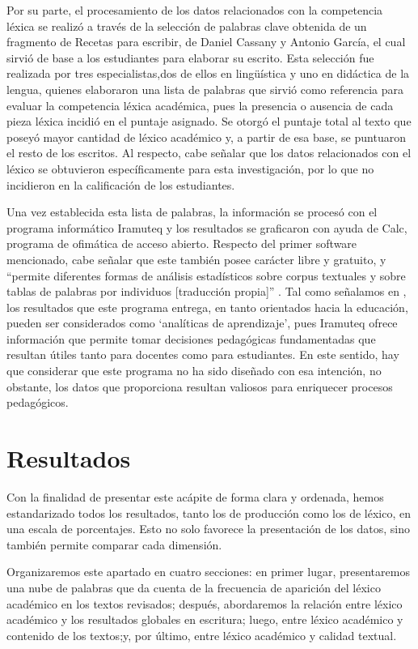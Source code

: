 \documentclass{textolivre-html}
\begin{document}
Por su parte, el procesamiento de los datos relacionados con la competencia
léxica se realizó a través de la selección de palabras clave obtenida de un
fragmento de Recetas para escribir, de Daniel Cassany y Antonio García, el cual
sirvió de base a los estudiantes para elaborar su escrito. Esta selección fue
realizada por tres especialistas,dos de ellos en lingüística y uno en didáctica
de la lengua, quienes elaboraron una lista de palabras que sirvió como
referencia para evaluar la competencia léxica académica, pues la presencia o
ausencia de cada pieza léxica incidió en el puntaje asignado. Se otorgó
el puntaje total al texto que poseyó mayor cantidad de léxico académico y, a
partir de esa base, se puntuaron el resto de los escritos. Al respecto, cabe
señalar que los datos relacionados con el léxico se obtuvieron específicamente
para esta investigación, por lo que no incidieron en la calificación de los
estudiantes.

Una vez establecida esta lista de palabras, la información se procesó con
el programa informático Iramuteq y los resultados se graficaron con ayuda de
Calc, programa de ofimática de acceso abierto. Respecto del primer software
mencionado, cabe señalar que este también posee carácter libre y gratuito, y
“permite diferentes formas de análisis estadísticos sobre corpus textuales y
sobre tablas de palabras por individuos [traducción propia]” \cite[p. 513]{Camargo2013}.
Tal como señalamos en , los resultados que este programa
entrega, en tanto orientados hacia la educación, pueden ser considerados como
‘analíticas de aprendizaje’, pues Iramuteq ofrece información que permite tomar
decisiones pedagógicas fundamentadas que resultan útiles tanto para docentes
como para estudiantes. En este sentido, hay que considerar que este programa no
ha sido diseñado con esa intención, no obstante, los datos que proporciona
resultan valiosos para enriquecer procesos pedagógicos.



\section{Resultados}\label{sec-resultados}
Con la finalidad de presentar este acápite de forma clara y ordenada,
hemos estandarizado todos los resultados, tanto los de producción como los de
léxico, en una escala de porcentajes. Esto no solo favorece la presentación de
los datos, sino también permite comparar cada dimensión.

Organizaremos este apartado en cuatro secciones: en primer lugar,
presentaremos una nube de palabras que da cuenta de la frecuencia de aparición
del léxico académico en los textos revisados; después, abordaremos la relación
entre léxico académico y los resultados globales en escritura; luego, entre
léxico académico y contenido de los textos;y, por último, entre léxico
académico y calidad textual.
\end{document}
